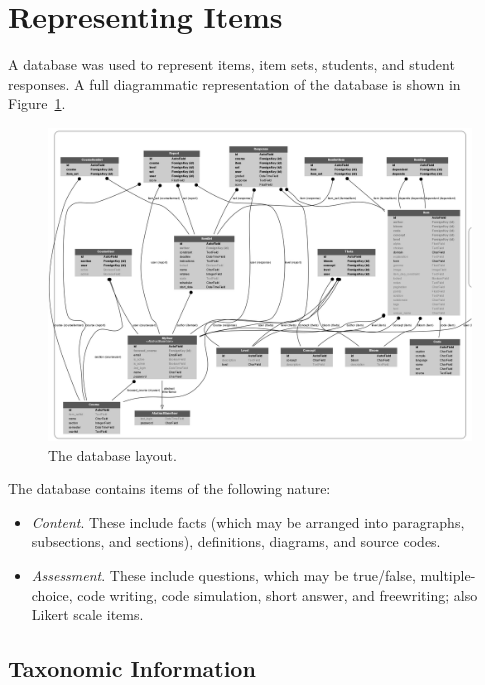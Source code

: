 \section{Representing Items}

A database was used to represent items, item sets, students, and student
responses.  A full diagrammatic representation of the database is shown in
Figure~\ref{fig:database}.

\begin{figure}
 \label{fig:database}
 \includegraphics[width=9in]{fig/database.png} 
 \caption{The database layout.}
\end{figure}

The database contains items of the following nature:

\begin{itemize}

  \item \emph{Content}.  These include facts (which may be arranged into
  paragraphs, subsections, and sections), definitions, diagrams, and source
  codes.

  \item \emph{Assessment}.  These include questions, which may be true/false,
  multiple-choice, code writing, code simulation, short answer, and
  freewriting; also Likert scale items.

\end{itemize}

\subsection{Taxonomic Information}

